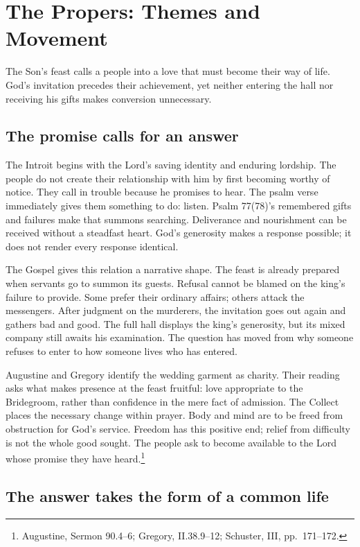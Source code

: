 \section{The Propers: Themes and Movement}

The Son's feast calls a people into a love that must become their way of
life. God's invitation precedes their achievement, yet neither entering
the hall nor receiving his gifts makes conversion unnecessary.

\subsection{The promise calls for an answer}

The Introit begins with the Lord's saving identity and enduring lordship.
The people do not create their relationship with him by first becoming
worthy of notice. They call in trouble because he promises to hear.
The psalm verse immediately gives them something to do: listen.
Psalm 77(78)'s remembered gifts and failures make that summons searching.
Deliverance and nourishment can be received without a steadfast heart.
God's generosity makes a response possible; it does not render every
response identical.

The Gospel gives this relation a narrative shape. The feast is already
prepared when servants go to summon its guests. Refusal cannot be blamed
on the king's failure to provide. Some prefer their ordinary affairs;
others attack the messengers. After judgment on the murderers, the
invitation goes out again and gathers bad and good. The full hall displays
the king's generosity, but its mixed company still awaits his examination.
The question has moved from why someone refuses to enter to how someone
lives who has entered.

Augustine and Gregory identify the wedding garment as charity. Their
reading asks what makes presence at the feast fruitful: love appropriate
to the Bridegroom, rather than confidence in the mere fact of admission.
The Collect places the necessary change within prayer. Body and mind
are to be freed from obstruction for God's service. Freedom has this
positive end; relief from difficulty is not the whole good sought.
The people ask to become available to the Lord whose promise they have
heard.\footnote{Augustine, Sermon 90.4--6; Gregory,  II.38.9--12; Schuster,  III,
pp.~171--172.}

\subsection{The answer takes the form of a common life}

